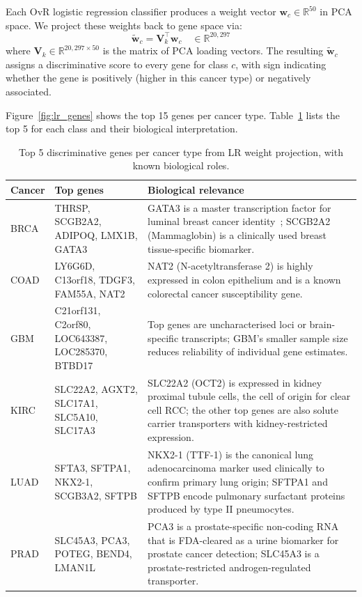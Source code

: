 \documentclass[11pt,letterpaper]{article}
\begin{document}
Each OvR logistic regression classifier produces a weight vector
$\mathbf{w}_c \in \mathbb{R}^{50}$ in PCA space.  We project these weights
back to gene space via:
\begin{equation}
  \tilde{\mathbf{w}}_c = \mathbf{V}_k^\top \mathbf{w}_c
  \quad \in \mathbb{R}^{20{,}297}
\end{equation}
where $\mathbf{V}_k \in \mathbb{R}^{20{,}297 \times 50}$ is the matrix of
PCA loading vectors.  The resulting $\tilde{\mathbf{w}}_c$ assigns a
discriminative score to every gene for class $c$, with sign indicating whether
the gene is positively (higher in this cancer type) or negatively associated.

Figure~\ref{fig:lr_genes} shows the top 15 genes per cancer type.
Table~\ref{tab:top_genes} lists the top 5 for each class and their biological
interpretation.

\begin{table}[H]
  \centering
  \caption{Top 5 discriminative genes per cancer type from LR weight
           projection, with known biological roles.}
  \label{tab:top_genes}
  \small
  \begin{tabular}{llp{7cm}}
    \toprule
    Cancer & Top genes & Biological relevance \\
    \midrule
    BRCA & THRSP, SCGB2A2, ADIPOQ, LMX1B, GATA3
         & GATA3 is a master transcription factor for luminal breast cancer
           identity~\cite{cimino2013}; SCGB2A2 (Mammaglobin) is a
           clinically used breast tissue-specific biomarker. \\[3pt]
    COAD & LY6G6D, C13orf18, TDGF3, FAM55A, NAT2
         & NAT2 (N-acetyltransferase 2) is highly expressed in colon
           epithelium and is a known colorectal cancer susceptibility gene. \\[3pt]
    GBM  & C21orf131, C2orf80, LOC643387, LOC285370, BTBD17
         & Top genes are uncharacterised loci or brain-specific transcripts;
           GBM's smaller sample size reduces reliability of individual gene
           estimates. \\[3pt]
    KIRC & SLC22A2, AGXT2, SLC17A1, SLC5A10, SLC17A3
         & SLC22A2 (OCT2) is expressed in kidney proximal tubule cells, the
           cell of origin for clear cell RCC; the other top genes are also
           solute carrier transporters with kidney-restricted expression. \\[3pt]
    LUAD & SFTA3, SFTPA1, NKX2-1, SCGB3A2, SFTPB
         & NKX2-1 (TTF-1) is the canonical lung adenocarcinoma marker used
           clinically to confirm primary lung origin; SFTPA1 and SFTPB encode
           pulmonary surfactant proteins produced by type II pneumocytes. \\[3pt]
    PRAD & SLC45A3, PCA3, POTEG, BEND4, LMAN1L
         & PCA3 is a prostate-specific non-coding RNA that is FDA-cleared
           as a urine biomarker for prostate cancer detection; SLC45A3 is a
           prostate-restricted androgen-regulated transporter. \\
    \bottomrule
  \end{tabular}
\end{table}
\end{document}
